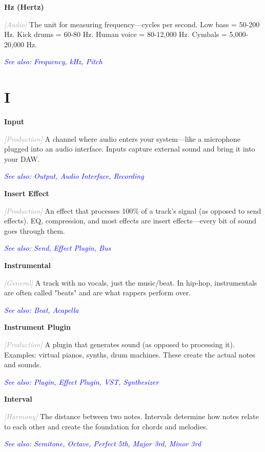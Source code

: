 \documentclass[11pt,letterpaper]{article}
\newcommand{\term}[1]{\textbf{\large\color{purple}#1}}
\newcommand{\category}[1]{\textcolor{darkgray}{\textit{\small [#1]}}}
\newcommand{\seealso}[1]{\textcolor{blue}{\textit{See also: #1}}}
\newenvironment{termdef}[1]
  {\noindent\term{#1}\par\nopagebreak}
  {\par\vspace{0.3em}}
\begin{document}
\begin{termdef}{Hz (Hertz)}
\category{Audio}
The unit for measuring frequency—cycles per second. Low bass = 50-200 Hz. Kick drums = 60-80 Hz. Human voice = 80-12,000 Hz. Cymbals = 5,000-20,000 Hz.

\seealso{Frequency, kHz, Pitch}
\end{termdef}

\newpage


\section*{I}

\begin{termdef}{Input}
\category{Production}
A channel where audio enters your system—like a microphone plugged into an audio interface. Inputs capture external sound and bring it into your DAW.

\seealso{Output, Audio Interface, Recording}
\end{termdef}

\begin{termdef}{Insert Effect}
\category{Production}
An effect that processes 100\% of a track's signal (as opposed to send effects). EQ, compression, and most effects are insert effects—every bit of sound goes through them.

\seealso{Send, Effect Plugin, Bus}
\end{termdef}

\begin{termdef}{Instrumental}
\category{General}
A track with no vocals, just the music/beat. In hip-hop, instrumentals are often called "beats" and are what rappers perform over.

\seealso{Beat, Acapella}
\end{termdef}

\begin{termdef}{Instrument Plugin}
\category{Production}
A plugin that generates sound (as opposed to processing it). Examples: virtual pianos, synths, drum machines. These create the actual notes and sounds.

\seealso{Plugin, Effect Plugin, VST, Synthesizer}
\end{termdef}

\begin{termdef}{Interval}
\category{Harmony}
The distance between two notes. Intervals determine how notes relate to each other and create the foundation for chords and melodies.

\seealso{Semitone, Octave, Perfect 5th, Major 3rd, Minor 3rd}
\end{termdef}
\end{document}

